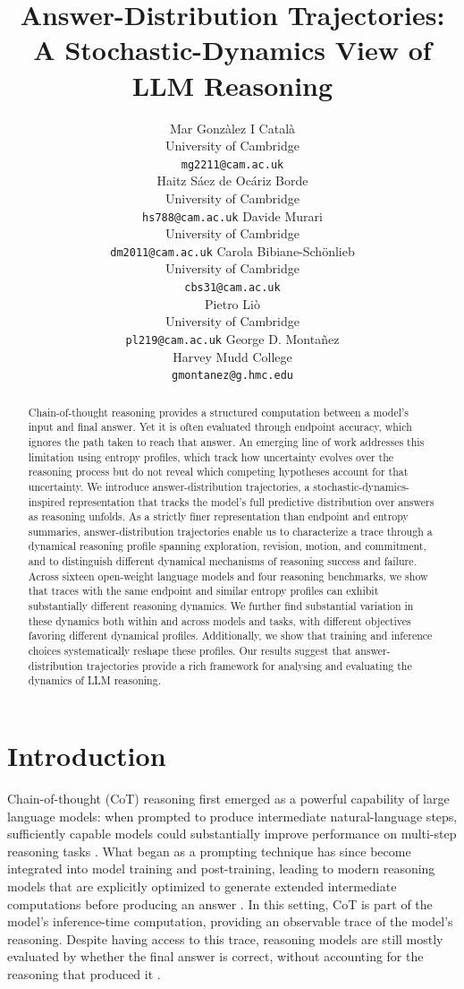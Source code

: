 \documentclass{article}
\title{Answer-Distribution Trajectories: \\ A Stochastic-Dynamics View of LLM Reasoning}
\author{%
  Mar Gonzàlez I Català \\
  University of Cambridge\\
  \texttt{mg2211@cam.ac.uk} \\
  \And
  Haitz Sáez de Ocáriz Borde \\
  University of Cambridge \\
  \texttt{hs788@cam.ac.uk}
  \And
  Davide Murari \\
  University of Cambridge \\
  \texttt{dm2011@cam.ac.uk}
  \And
  Carola Bibiane-Schönlieb \\
  University of Cambridge \\
  \texttt{cbs31@cam.ac.uk} \\
  \And
  Pietro Liò \\
  University of Cambridge \\
  \texttt{pl219@cam.ac.uk}
  \And
  George D. Montañez \\
  Harvey Mudd College \\
  \texttt{gmontanez@g.hmc.edu} \\
}
\begin{document}
\maketitle


\begin{abstract}
Chain-of-thought reasoning provides a structured computation between a model’s input and final answer. Yet it is often evaluated through endpoint accuracy, which ignores the path taken to reach that answer. An emerging line of work addresses this limitation using entropy profiles, which track how uncertainty evolves over the reasoning process but do not reveal which competing hypotheses account for that uncertainty. We introduce answer-distribution trajectories, a stochastic-dynamics-inspired representation that tracks the model’s full predictive distribution over answers as reasoning unfolds. As a strictly finer representation than endpoint and entropy summaries, answer-distribution trajectories enable us to characterize a trace through a dynamical reasoning profile spanning exploration, revision, motion, and commitment, and to distinguish different dynamical mechanisms of reasoning success and failure. Across sixteen open-weight language models and four reasoning benchmarks, we show that traces with the same endpoint and similar entropy profiles can exhibit substantially different reasoning dynamics. We further find substantial variation in these dynamics both within and across models and tasks, with different objectives favoring different dynamical profiles. Additionally, we show that training and inference choices systematically reshape these profiles. Our results suggest that answer-distribution trajectories provide a rich framework for analysing and evaluating the dynamics of LLM reasoning.
\end{abstract}

\section{Introduction}
\label{sec:introduction}

Chain-of-thought (CoT) reasoning first emerged as a powerful capability of large language models: when prompted to produce intermediate natural-language steps, sufficiently capable models could substantially improve performance on multi-step reasoning tasks \cite{kojima2022large, wei2022chain}. What began as a prompting technique has since become integrated into model training and post-training, leading to modern reasoning models that are explicitly optimized to generate extended intermediate computations before producing an answer \cite{Guo_2025, openai2026openaio1card}. In this setting, CoT is part of the model's inference-time computation, providing an observable trace of the model’s reasoning. Despite having access to this trace, reasoning models are still mostly evaluated by whether the final answer is correct, without accounting for the reasoning that produced it \cite{mao2024champ, prasad2023receval,xia2025evaluating,uesato2022solving}.
\end{document}
